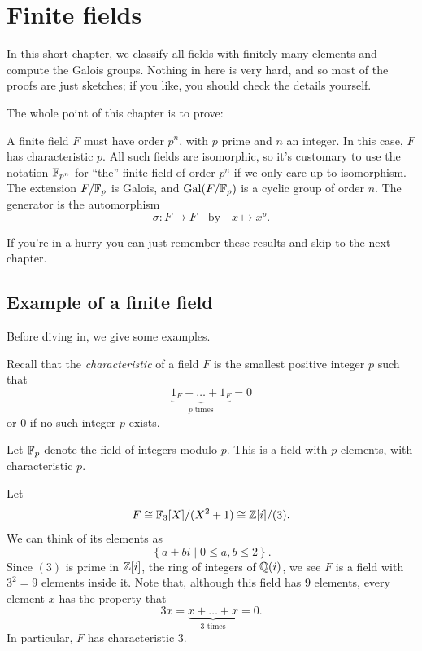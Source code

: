 \chapter{Finite fields}
\label{ch:finite_fields}
In this short chapter, we classify all fields with finitely many elements
and compute the Galois groups.
Nothing in here is very hard, and so most of the proofs are just sketches;
if you like, you should check the details yourself.

The whole point of this chapter is to prove:
\begin{itemize}
	\ii A finite field $F$ must have order $p^n$, with $p$ prime and $n$ an integer.
	\ii In this case, $F$ has characteristic $p$.
	\ii All such fields are isomorphic,
	so it's customary to use the notation $\mathbb F_{p^n}$
	for ``the'' finite field of order $p^n$ if we only care up to isomorphism.
	\ii The extension $F/\mathbb F_p$ is Galois, and $\operatorname{Gal}(F/\mathbb F_p)$ is a cyclic group of order $n$.
	The generator is the automorphism \[ \sigma \colon F \to F \quad\text{by}\quad x \mapsto x^p. \]
\end{itemize}
If you're in a hurry you can just remember these results and skip to the next chapter.

\section{Example of a finite field}
Before diving in, we give some examples.

Recall that the \emph{characteristic} of a field $F$
is the smallest positive integer $p$ such that
\[ \underbrace{1_F + \dots + 1_F}_{\text{$p$ times}} = 0 \]
or $0$ if no such integer $p$ exists.

\begin{example}
	Let $\mathbb F_p$ denote the field of integers modulo $p$.
	This is a field with $p$ elements, with characteristic $p$.
\end{example}

\begin{example}
	Let
	\[ F \cong \mathbb F_3[X]/(X^2+1) \cong \mathbb Z[i] / (3). \]
	We can think of its elements as \[ \left\{ a + bi \mid 0 \le a,b \le 2 \right\}. \]
	Since $(3)$ is prime in $\mathbb Z[i]$, the ring of integers of $\mathbb Q(i)$,
	we see $F$ is a field with $3^2 = 9$ elements inside it.
	Note that, although this field has $9$ elements, every element $x$ has the property that
	\[ 3x = \underbrace{x + \dots + x}_{\text{$3$ times}} = 0. \]
	In particular, $F$ has characteristic $3$.
\end{example}

